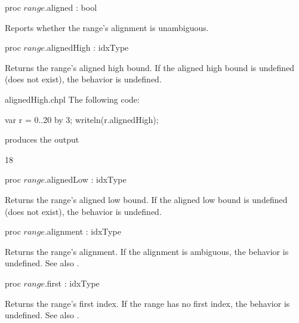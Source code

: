 \begin{protohead}
proc $range$.aligned : bool
\end{protohead}
\begin{protobody}
Reports whether the range's alignment is unambiguous.
\end{protobody}

\begin{protohead}
proc $range$.alignedHigh : idxType
\end{protohead}
\begin{protobody}
Returns the range's aligned high bound.
If the aligned high bound is undefined (does not exist),
the behavior is undefined.
\end{protobody}
\begin{chapelexample}{alignedHigh.chpl}
The following code:
\begin{chapel}
var r = 0..20 by 3;
writeln(r.alignedHigh);
\end{chapel}
produces the output
\begin{chapelprintoutput}{}
18
\end{chapelprintoutput}
\end{chapelexample}

\begin{protohead}
proc $range$.alignedLow : idxType
\end{protohead}
\begin{protobody}
Returns the range's aligned low bound.
If the aligned low bound is undefined (does not exist),
the behavior is undefined.
\end{protobody}

\begin{protohead}
proc $range$.alignment : idxType
\end{protohead}
\begin{protobody}
Returns the range's alignment.
If the alignment is ambiguous, the behavior is undefined.
See also .
\end{protobody}

\begin{protohead}
proc $range$.first : idxType
\end{protohead}
\begin{protobody}
Returns the range's first index.
If the range has no first index, the behavior is undefined.
See also .
\end{protobody}

